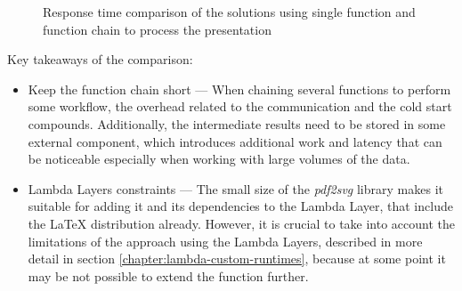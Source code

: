 \begin{figure}[H]
    \caption{Response time comparison of the solutions using single function and function chain to process the presentation}
    \label{chart:step-function-single-function-vs-function-chain}
\end{figure}

Key takeaways of the comparison:

\begin{itemize}
   \item Keep the function chain short --- When chaining several functions to perform some workflow, the overhead related to the communication and the cold start compounds. Additionally, the intermediate results need to be stored in some external component, which introduces additional work and latency that can be noticeable especially when working with large volumes of the data.
   \item Lambda Layers constraints --- The small size of the \textit{pdf2svg} library makes it suitable for adding it and its dependencies to the Lambda Layer, that include the LaTeX distribution already. However, it is crucial to take into account the limitations of the approach using the Lambda Layers, described in more detail in section \ref{chapter:lambda-custom-runtimes}, because at some point it may be not possible to extend the function further.
\end{itemize}

